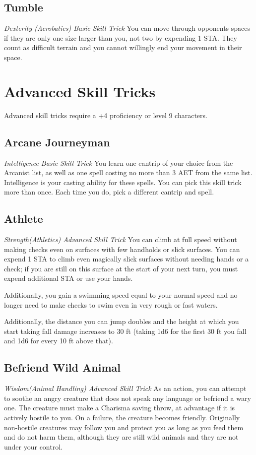 \subsection{Tumble}
\textit{Dexterity (Acrobatics) Basic Skill Trick}
You can move through opponents spaces if they are only one size larger than you, not two by expending 1 STA. They count as difficult terrain and you cannot willingly end your movement in their space.

\section{Advanced Skill Tricks}
\label{sec:skill-tricks-advanced}

Advanced skill tricks require a +4 proficiency or level 9 characters.

\subsection{Arcane Journeyman}
\textit{Intelligence Basic Skill Trick}
You learn one cantrip of your choice from the Arcanist list, as well as one spell costing no more than 3 AET from the same list. Intelligence is your casting ability for these spells. You can pick this skill trick more than once. Each time you do, pick a different cantrip and spell.

\subsection{Athlete}
\textit{Strength(Athletics) Advanced Skill Trick}
You can climb at full speed without making checks even on surfaces with few handholds or slick surfaces. You can expend 1 STA to climb even magically slick surfaces without needing hands or a check; if you are still on this surface at the start of your next turn, you must expend additional STA or use your hands.

Additionally, you gain a swimming speed equal to your normal speed and no longer need to make checks to swim even in very rough or fast waters.

Additionally, the distance you can jump doubles and the height at which you start taking fall damage increases to 30 ft (taking 1d6 for the first 30 ft you fall and 1d6 for every 10 ft above that).

\subsection{Befriend Wild Animal}
\textit{Wisdom(Animal Handling) Advanced Skill Trick}
As an action, you can attempt to soothe an angry creature that does not speak any language or befriend a wary one. The creature must make a Charisma saving throw, at advantage if it is actively hostile to you. On a failure, the creature becomes friendly. Originally non-hostile creatures may follow you and protect you as long as you feed them and do not harm them, although they are still wild animals and they are not under your control.

